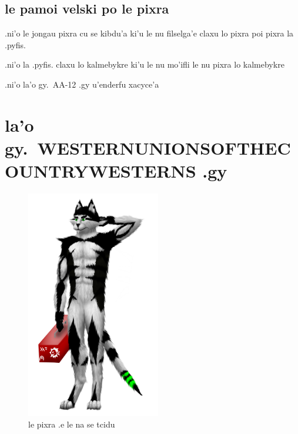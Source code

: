 \documentclass{report}
\newcommand\imageheight{10cm}
\begin{document}
\section{le pamoi velski po le pixra}
.ni'o le jongau pixra cu se kibdu'a ki'u le nu filselga'e claxu lo pixra poi pixra la .pyfis.

.ni'o la .pyfis. claxu lo kalmebykre ki'u le nu mo'ifli le nu pixra lo kalmebykre

.ni'o la'o gy.\ AA-12 .gy u'enderfu xacyce'a

\chapter{la'o gy.\ WESTERNUNIONSOFTHECOUNTRYWESTERNS .gy}
\begin{figure}[ht]
	\centering
	\includegraphics[height=\imageheight]{50x/toolbox/westernunionsofthecountrywesterns.png}
	\caption[center]{le pixra .e le na se tcidu}
\end{figure}
\end{document}

